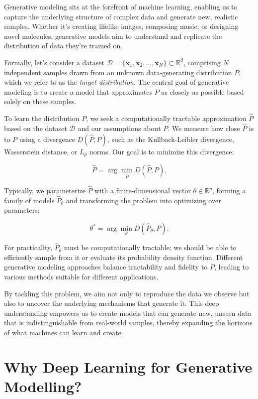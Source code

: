Generative modeling sits at the forefront of machine learning, enabling us to capture the underlying structure of complex data and generate new, realistic samples. Whether it's creating lifelike images, composing music, or designing novel molecules, generative models aim to understand and replicate the distribution of data they're trained on.

Formally, let's consider a dataset \( \mathcal{D} = \{ \mathbf{x}_1, \mathbf{x}_2, \dots, \mathbf{x}_N \} \subset \mathbb{R}^d \), comprising \( N \) independent samples drawn from an unknown data-generating distribution \( P \), which we refer to as the \textit{target distribution}. The central goal of generative modeling is to create a model that approximates \( P \) as closely as possible based solely on these samples.

To learn the distribution \( P \), we seek a computationally tractable approximation \( \hat{P} \) based on the dataset \( \mathcal{D} \) and our assumptions about \( P \). We measure how close \( \hat{P} \) is to \( P \) using a divergence \( D(\hat{P}, P) \), such as the Kullback-Leibler divergence, Wasserstein distance, or \( L_p \) norms. Our goal is to minimize this divergence:

\[
\hat{P} = \arg \min_{\hat{P}} D(\hat{P}, P).
\]

Typically, we parameterize \( \hat{P} \) with a finite-dimensional vector \( \theta \in \mathbb{R}^p \), forming a family of models \( \hat{P}_\theta \) and transforming the problem into optimizing over parameters:

\[
\theta^* = \arg \min_\theta D(\hat{P}_\theta, P).
\]

For practicality, \( \hat{P}_\theta \) must be computationally tractable; we should be able to efficiently sample from it or evaluate its probability density function. Different generative modeling approaches balance tractability and fidelity to \( P \), leading to various methods suitable for different applications.

By tackling this problem, we aim not only to reproduce the data we observe but also to uncover the underlying mechanisms that generate it. This deep understanding empowers us to create models that can generate new, unseen data that is indistinguishable from real-world samples, thereby expanding the horizons of what machines can learn and create.

\section{Why Deep Learning for Generative Modelling?}

